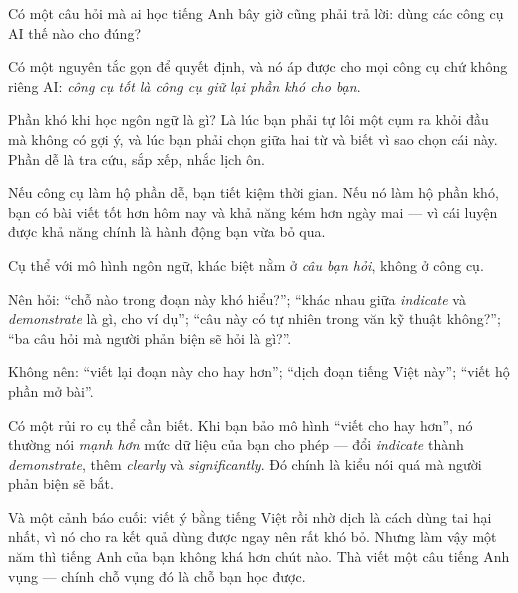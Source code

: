 \documentclass[../../english.tex]{subfiles}
\begin{document}
\begin{dongian}
Có một câu hỏi mà ai học tiếng Anh bây giờ cũng phải trả lời: dùng các công cụ AI thế nào cho đúng?

Có một nguyên tắc gọn để quyết định, và nó áp được cho mọi công cụ chứ không riêng AI: \emph{công cụ tốt là công cụ giữ lại phần khó cho bạn}.

Phần khó khi học ngôn ngữ là gì? Là lúc bạn phải tự lôi một cụm ra khỏi đầu mà không có gợi ý, và lúc bạn phải chọn giữa hai từ và biết vì sao chọn cái này. Phần dễ là tra cứu, sắp xếp, nhắc lịch ôn.

Nếu công cụ làm hộ phần dễ, bạn tiết kiệm thời gian. Nếu nó làm hộ phần khó, bạn có bài viết tốt hơn hôm nay và khả năng kém hơn ngày mai --- vì cái luyện được khả năng chính là hành động bạn vừa bỏ qua.

Cụ thể với mô hình ngôn ngữ, khác biệt nằm ở \emph{câu bạn hỏi}, không ở công cụ.

Nên hỏi: ``chỗ nào trong đoạn này khó hiểu?''; ``khác nhau giữa \emph{indicate} và \emph{demonstrate} là gì, cho ví dụ''; ``câu này có tự nhiên trong văn kỹ thuật không?''; ``ba câu hỏi mà người phản biện sẽ hỏi là gì?''.

Không nên: ``viết lại đoạn này cho hay hơn''; ``dịch đoạn tiếng Việt này''; ``viết hộ phần mở bài''.

Có một rủi ro cụ thể cần biết. Khi bạn bảo mô hình ``viết cho hay hơn'', nó thường nói \emph{mạnh hơn} mức dữ liệu của bạn cho phép --- đổi \emph{indicate} thành \emph{demonstrate}, thêm \emph{clearly} và \emph{significantly}. Đó chính là kiểu nói quá mà người phản biện sẽ bắt.

Và một cảnh báo cuối: viết ý bằng tiếng Việt rồi nhờ dịch là cách dùng tai hại nhất, vì nó cho ra kết quả dùng được ngay nên rất khó bỏ. Nhưng làm vậy một năm thì tiếng Anh của bạn không khá hơn chút nào. Thà viết một câu tiếng Anh vụng --- chính chỗ vụng đó là chỗ bạn học được.
\end{dongian}
\end{document}
